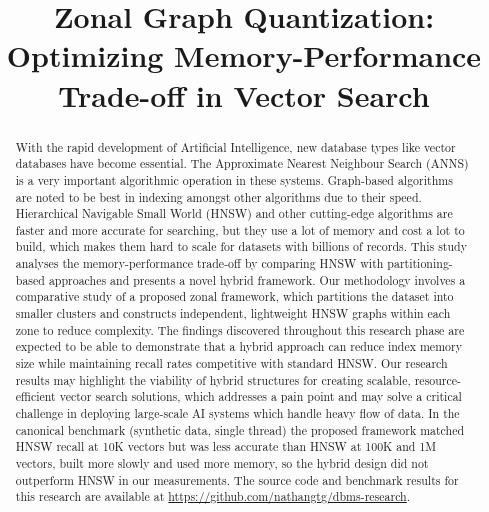 \documentclass[conference]{IEEEtran}
\begin{document}
\title{Zonal Graph Quantization: Optimizing Memory-Performance Trade-off in Vector Search}

\author{
\and
{}
\and
{}
}

\maketitle

\begin{abstract}
With the rapid development of Artificial Intelligence, new database types like vector databases have become essential. The Approximate Nearest Neighbour Search (ANNS) is a very important algorithmic operation in these systems. Graph-based algorithms are noted to be best in indexing amongst other algorithms due to their speed. Hierarchical Navigable Small World (HNSW) and other cutting-edge algorithms are faster and more accurate for searching, but they use a lot of memory and cost a lot to build, which makes them hard to scale for datasets with billions of records. This study analyses the memory-performance trade-off by comparing HNSW with partitioning-based approaches and presents a novel hybrid framework. Our methodology involves a comparative study of a proposed zonal framework, which partitions the dataset into smaller clusters and constructs independent, lightweight HNSW graphs within each zone to reduce complexity. The findings discovered throughout this research phase are expected to be able to demonstrate that a hybrid approach can reduce index memory size while maintaining recall rates competitive with standard HNSW. Our research results may highlight the viability of hybrid structures for creating scalable, resource-efficient vector search solutions, which addresses a pain point and may solve a critical challenge in deploying large-scale AI systems which handle heavy flow of data. In the canonical benchmark (synthetic data, single thread) the proposed framework matched HNSW recall at 10K vectors but was less accurate than HNSW at 100K and 1M vectors, built more slowly and used more memory, so the hybrid design did not outperform HNSW in our measurements. The source code and benchmark results for this research are available at \url{https://github.com/nathangtg/dbms-research}.
\end{abstract}
\end{document}
